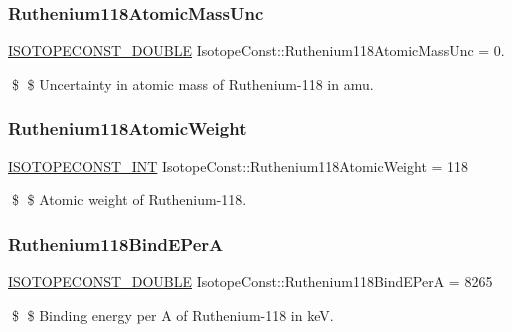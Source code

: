 \subsubsection{\texorpdfstring{Ruthenium118\+Atomic\+Mass\+Unc}{Ruthenium118AtomicMassUnc}}
{\footnotesize\ttfamily \mbox{\hyperlink{group___isotope_const-_macros_ga8f45a7272ce02c0b4c65c44636ed719a}{I\+S\+O\+T\+O\+P\+E\+C\+O\+N\+S\+T\+\_\+\+D\+O\+U\+B\+LE}} Isotope\+Const\+::\+Ruthenium118\+Atomic\+Mass\+Unc = 0.}

\$ \$ Uncertainty in atomic mass of Ruthenium-\/118 in amu. \mbox{\label{group___isotope_const-_ruthenium-_ru118_ga17674995dcc59310191b54f5eff4f43e}} 
\subsubsection{\texorpdfstring{Ruthenium118\+Atomic\+Weight}{Ruthenium118AtomicWeight}}
{\footnotesize\ttfamily \mbox{\hyperlink{group___isotope_const-_macros_ga5f18360b3e99483a35c32d789e62621c}{I\+S\+O\+T\+O\+P\+E\+C\+O\+N\+S\+T\+\_\+\+I\+NT}} Isotope\+Const\+::\+Ruthenium118\+Atomic\+Weight = 118}

\$ \$ Atomic weight of Ruthenium-\/118. \mbox{\label{group___isotope_const-_ruthenium-_ru118_gaded134288945193862d871ebb44502ac}} 
\subsubsection{\texorpdfstring{Ruthenium118\+Bind\+E\+PerA}{Ruthenium118BindEPerA}}
{\footnotesize\ttfamily \mbox{\hyperlink{group___isotope_const-_macros_ga8f45a7272ce02c0b4c65c44636ed719a}{I\+S\+O\+T\+O\+P\+E\+C\+O\+N\+S\+T\+\_\+\+D\+O\+U\+B\+LE}} Isotope\+Const\+::\+Ruthenium118\+Bind\+E\+PerA = 8265}

\$ \$ Binding energy per A of Ruthenium-\/118 in keV. \mbox{\label{group___isotope_const-_ruthenium-_ru118_ga34cbf0fb89ad34ef8adb2f7749829995}} 
